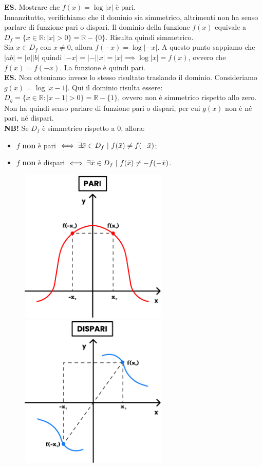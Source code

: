 \documentclass{article}
\begin{document}
\noindent\textbf{ES.} Mostrare che $f(x) = \log|x|$ è pari. \\
Innanzitutto, verifichiamo che il dominio sia simmetrico, altrimenti non ha senso parlare di funzione pari o dispari. Il dominio della funzione $f(x)$ equivale a $D_f = \{x \in \mathbb{R} : |x| > 0\} = \mathbb{R} - \{0\}$. Risulta quindi simmetrico.\\
Sia $x \in D_f$ con $x \neq 0$, allora $f(-x) = \log|-x|$. A questo punto sappiamo che $|ab| = |a||b|$ quindi $|-x| = |-||x| = |x| \implies \log|x| = f(x)$, ovvero che $f(x) = f(-x)$. La funzione è quindi pari.\\

\noindent\textbf{ES.} Non otteniamo invece lo stesso risultato traslando il dominio. Consideriamo $g(x) = \log|x - 1|$. Qui il dominio risulta essere: $D_g = \{x \in \mathbb{R} : |x - 1| > 0\} = \mathbb{R} - \{1\}$, ovvero non è simmetrico rispetto allo zero. Non ha quindi senso parlare di funzione pari o dispari, per cui $g(x)$ non è né pari, né dispari.\\

\noindent\textbf{NB!} Se $D_f$ è simmetrico rispetto a $0$, allora:
\begin{itemize}
    \item $f$ \textbf{non} è pari $\iff \exists \Bar{x} \in D_f \ | \ f(\Bar{x}) \neq f(- \Bar{x})$;
    \item $f$ \textbf{non} è dispari $\iff \exists \Bar{x} \in D_f \ | \ f(\Bar{x}) \neq - f(- \Bar{x})$.
\end{itemize}

\begin{figure}[!h]
    \centering
    \includegraphics[width=7cm]{./images/evenFunctions.pdf}\hfill
    \includegraphics[width=7cm]{./images/oddFunctions.pdf}
\end{figure}
\end{document}
